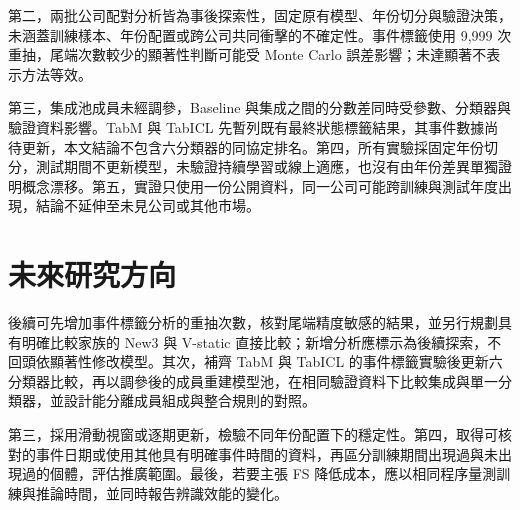 第二，兩批公司配對分析皆為事後探索性，固定原有模型、年份切分與驗證決策，未涵蓋訓練樣本、年份配置或跨公司共同衝擊的不確定性。事件標籤使用 9,999 次重抽，尾端次數較少的顯著性判斷可能受 Monte Carlo 誤差影響；未達顯著不表示方法等效。

第三，集成池成員未經調參，Baseline 與集成之間的分數差同時受參數、分類器與驗證資料影響。TabM 與 TabICL 先暫列既有最終狀態標籤結果，其事件數據尚待更新，本文結論不包含六分類器的同協定排名。第四，所有實驗採固定年份切分，測試期間不更新模型，未驗證持續學習或線上適應，也沒有由年份差異單獨證明概念漂移。第五，實證只使用一份公開資料，同一公司可能跨訓練與測試年度出現，結論不延伸至未見公司或其他市場。

\section{未來研究方向}

後續可先增加事件標籤分析的重抽次數，核對尾端精度敏感的結果，並另行規劃具有明確比較家族的 New3 與 V-static 直接比較；新增分析應標示為後續探索，不回頭依顯著性修改模型。其次，補齊 TabM 與 TabICL 的事件標籤實驗後更新六分類器比較，再以調參後的成員重建模型池，在相同驗證資料下比較集成與單一分類器，並設計能分離成員組成與整合規則的對照。

第三，採用滑動視窗或逐期更新，檢驗不同年份配置下的穩定性。第四，取得可核對的事件日期或使用其他具有明確事件時間的資料，再區分訓練期間出現過與未出現過的個體，評估推廣範圍。最後，若要主張 FS 降低成本，應以相同程序量測訓練與推論時間，並同時報告辨識效能的變化。
\endgroup
